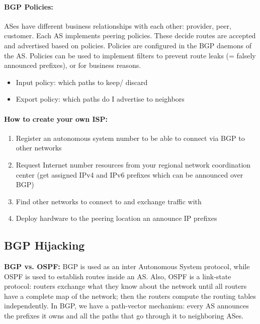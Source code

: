 \paragraph{BGP Policies: }ASes have different business relationships with each other: provider, peer, customer. Each AS implements peering policies. These decide routes are accepted and advertised based on policies. Policies are configured in the BGP daemons of the AS. Policies can be used to implement filters to prevent route leaks (= falsely announced prefixes), or for business reasons.

\begin{itemize}
	\item Input policy: which paths to keep/ discard
	\item Export policy: which paths do I advertise to neighbors
\end{itemize}

\paragraph{How to create your own ISP:}
\begin{enumerate}
    \item Register an autonomous system number to be able to connect via BGP to other networks
    \item Request Internet number resources from your regional network coordination center (get assigned IPv4 and IPv6 prefixes which can be announced over BGP)
    \item Find other networks to connect to and exchange traffic with
    \item Deploy hardware to the peering location an announce IP prefixes
\end{enumerate}

\subsection{BGP Hijacking}
\textbf{BGP vs. OSPF:} BGP is used as an inter Autonomous System protocol, while OSPF is used to establish routes inside an AS. Also, OSPF is a link-state protocol: routers exchange what they know about the network until all routers have a complete map of the network; then the routers compute the routing tables independently. In BGP, we have a path-vector mechanism: every AS announces the prefixes it owns and all the paths that go through it to neighboring ASes.

